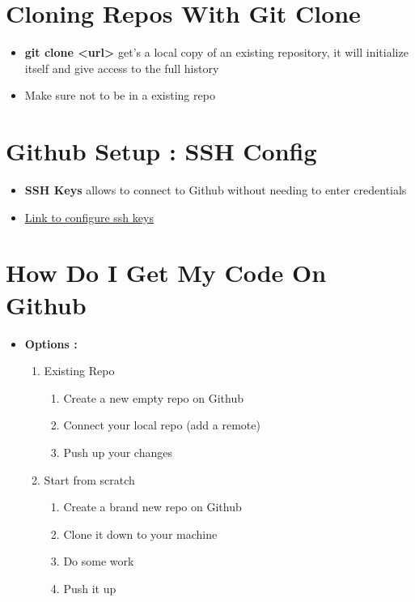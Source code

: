 \documentclass{report}
\newcommand{\warning}{
	{\fontencoding{U}\fontfamily{futs}\selectfont\char 66\relax}
}
\begin{document}
\section{Cloning Repos With Git Clone}

\begin{itemize}
	\item \textbf{git clone <url>} get's a local copy of an existing repository, it will initialize itself and give access to the full history 
	\item \warning Make sure not to be in a existing repo 
\end{itemize}


\section{Github Setup : SSH Config}

\begin{itemize}
	\item \textbf{SSH Keys} allows to connect to Github without needing to enter credentials 
	\item \href{https://docs.github.com/en/authentication/connecting-to-github-with-ssh/generating-a-new-ssh-key-and-adding-it-to-the-ssh-agent}{Link to configure ssh keys} 
\end{itemize}


\section{How Do I Get My Code On Github}

\begin{itemize}
	\item \textbf{Options :}
		\begin{enumerate}
			\item Existing Repo
				\begin{enumerate}
					\item Create a new empty repo on Github 
					\item Connect your local repo (add a remote) 
					\item Push up your changes
				\end{enumerate}
			\item Start from scratch \label{scratch}
				\begin{enumerate}
					\item Create a brand new repo on Github 
					\item Clone it down to your machine 
					\item Do some work 
					\item Push it up
				\end{enumerate}
		\end{enumerate}
\end{itemize}
\end{document}
